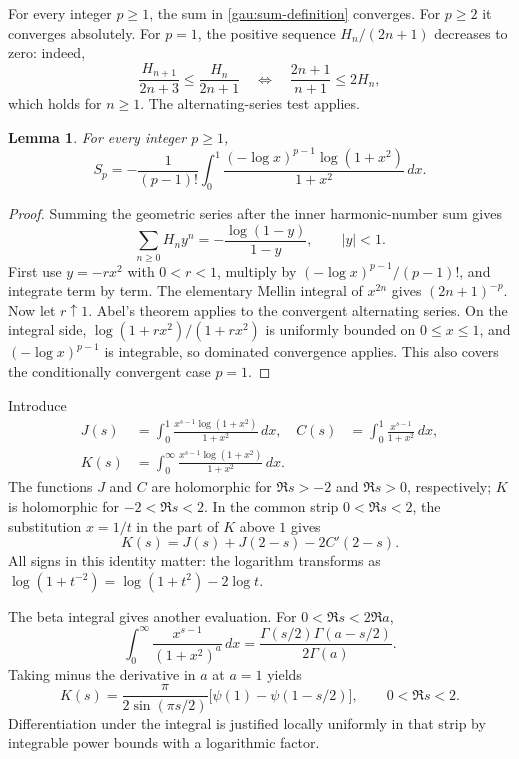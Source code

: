 \documentclass[11pt,a4paper]{article}
\newtheorem{lemma}[theorem]{Lemma}
\theoremstyle{definition}
\theoremstyle{remark}
\numberwithin{equation}{section}
\begin{document}
For every integer $p\geq1$, the sum in \eqref{gau:sum-definition} converges.
For $p\geq2$ it converges absolutely. For $p=1$, the positive sequence
$H_n/(2n+1)$ decreases to zero: indeed,
\[
 \frac{H_{n+1}}{2n+3}\leq\frac{H_n}{2n+1}
 \quad\Longleftrightarrow\quad
 \frac{2n+1}{n+1}\leq2H_n,
\]
which holds for $n\geq1$. The alternating-series test applies.

\begin{lemma}\label{gau:moment}
For every integer $p\geq1$,
\begin{equation}\label{gau:moment-formula}
 S_p=-\frac1{(p-1)!}\int_0^1
       \frac{(-\log x)^{p-1}\log(1+x^2)}{1+x^2}\,dx.
\end{equation}
\end{lemma}
\begin{proof}
Summing the geometric series after the inner harmonic-number sum gives
\[
 \sum_{n\geq0}H_n y^n=-\frac{\log(1-y)}{1-y},\qquad |y|<1.
\]
First use $y=-r x^2$ with $0<r<1$, multiply by
$(-\log x)^{p-1}/(p-1)!$, and integrate term by term. The elementary
Mellin integral of $x^{2n}$ gives $(2n+1)^{-p}$.
Now let $r\uparrow1$. Abel's theorem applies to the convergent alternating
series. On the integral side,
$\log(1+rx^2)/(1+rx^2)$ is uniformly bounded on $0\leq x\leq1$,
and $(-\log x)^{p-1}$ is integrable, so dominated convergence applies.
This also covers the conditionally convergent case $p=1$.
\end{proof}

Introduce
\begin{align}
 J(s)&=\int_0^1\frac{x^{s-1}\log(1+x^2)}{1+x^2}\,dx,
 & C(s)&=\int_0^1\frac{x^{s-1}}{1+x^2}\,dx,\label{gau:mellin-defs}\\
 K(s)&=\int_0^\infty\frac{x^{s-1}\log(1+x^2)}{1+x^2}\,dx.
 \nonumber
\end{align}
The functions $J$ and $C$ are holomorphic for $\Re s>-2$ and $\Re s>0$,
respectively; $K$ is holomorphic for $-2<\Re s<2$.
In the common strip $0<\Re s<2$, the substitution $x=1/t$ in the
part of $K$ above $1$ gives
\begin{equation}\label{gau:reflection}
 K(s)=J(s)+J(2-s)-2C'(2-s).
\end{equation}
All signs in this identity matter: the logarithm transforms as
$\log(1+t^{-2})=\log(1+t^2)-2\log t$.

The beta integral gives another evaluation. For
$0<\Re s<2\Re a$,
\[
 \int_0^\infty\frac{x^{s-1}}{(1+x^2)^a}\,dx
 =\frac{\Gamma(s/2)\Gamma(a-s/2)}{2\Gamma(a)}.
\]
Taking minus the derivative in $a$ at $a=1$ yields
\begin{equation}\label{gau:complete-mellin}
 K(s)=\frac{\pi}{2\sin(\pi s/2)}
          \bigl[\psi(1)-\psi(1-s/2)\bigr],
 \qquad 0<\Re s<2.
\end{equation}
Differentiation under the integral is justified locally uniformly in that
strip by integrable power bounds with a logarithmic factor.
\end{document}
